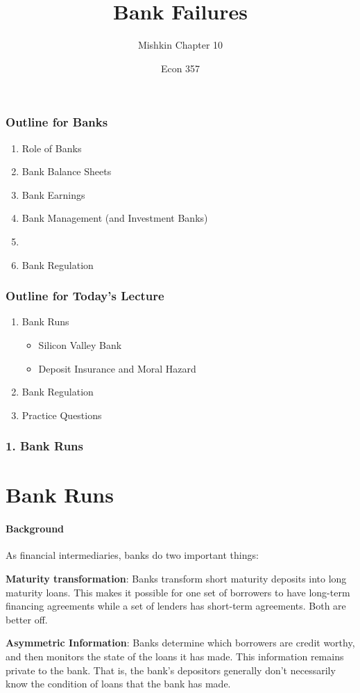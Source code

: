 \documentclass{beamer}
\title{Bank Failures}
\subtitle{Mishkin Chapter 10}
\author{Econ 357}
\date{\week}
\begin{document}
\frame{\titlepage}

\begin{frame}
    \frametitle{Outline for Banks}
        \begin{enumerate}
            \item Role of Banks
            \item Bank Balance Sheets
            \item Bank Earnings
            \item Bank Management (and Investment Banks)
            \item {}
            \item Bank Regulation
        \end{enumerate}
\end{frame}


\begin{frame}
    \frametitle{Outline for Today's Lecture}
    
    \begin{enumerate}
        \item Bank Runs
        \begin{itemize}
            \item Silicon Valley Bank
            \item Deposit Insurance and Moral Hazard
        \end{itemize}
        \item Bank Regulation
        \item Practice Questions
    \end{enumerate}

\end{frame}


\begin{frame}[t]
\frametitle{1. Bank Runs}
\section{Bank Runs}
\framesubtitle{Background}

    As financial intermediaries, banks do two important things:
    \vspace{1em}
    
    \textbf{Maturity transformation}:   Banks transform short maturity deposits into long maturity loans.   This makes it possible for one set of borrowers to have long-term financing agreements while a set of lenders has short-term agreements.   Both are better off. 
    \vspace{1em}
    
    \textbf{Asymmetric Information}: Banks determine which borrowers are credit worthy, and then monitors the state of the loans it has made.  This information remains private to the bank.   That is, the bank’s depositors generally don’t necessarily know the condition of loans that the bank has made. 

\end{frame}
\end{document}
